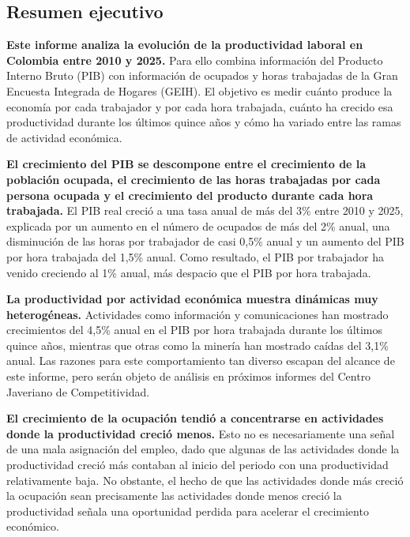 \documentclass[12pt, a4paper]{article}
\begin{document}
\begin{mdframed}[
  linewidth=1pt,
  linecolor=gray!60,
  backgroundcolor=gray!6,
  innertopmargin=12pt,
  innerbottommargin=12pt,
  innerleftmargin=14pt,
  innerrightmargin=14pt
]
\section*{Resumen ejecutivo}
\textbf{Este informe analiza la evolución de la productividad laboral en Colombia entre 2010 y 2025.} Para ello combina información del Producto Interno Bruto (PIB) con información de ocupados y horas trabajadas de la Gran Encuesta Integrada de Hogares (GEIH). El objetivo es medir cuánto produce la economía por cada trabajador y por cada hora trabajada, cuánto ha crecido esa productividad durante los últimos quince años y cómo ha variado entre las ramas de actividad económica.

\textbf{El crecimiento del PIB se descompone entre el crecimiento de la población ocupada, el crecimiento de las horas trabajadas por cada persona ocupada y el crecimiento del producto durante cada hora trabajada.} El PIB real creció a una tasa anual de más del 3\% entre 2010 y 2025, explicada por un aumento en el número de ocupados de más del 2\% anual, una disminución de las horas por trabajador de casi 0,5\% anual y un aumento del PIB por hora trabajada del 1,5\% anual. Como resultado, el PIB por trabajador ha venido creciendo al 1\% anual, más despacio que el PIB por hora trabajada.

\textbf{La productividad por actividad económica muestra dinámicas muy heterogéneas.} Actividades como información y comunicaciones han mostrado crecimientos del 4,5\% anual en el PIB por hora trabajada durante los últimos quince años, mientras que otras como la minería han mostrado caídas del 3,1\% anual. Las razones para este comportamiento tan diverso escapan del alcance de este informe, pero serán objeto de análisis en próximos informes del Centro Javeriano de Competitividad.

\textbf{El crecimiento de la ocupación tendió a concentrarse en actividades donde la productividad creció menos.} Esto no es necesariamente una señal de una mala asignación del empleo, dado que algunas de las actividades donde la productividad creció más contaban al inicio del periodo con una productividad relativamente baja. No obstante, el hecho de que las actividades donde más creció la ocupación sean precisamente las actividades donde menos creció la productividad señala una oportunidad perdida para acelerar el crecimiento económico.
\end{mdframed}
\end{document}
